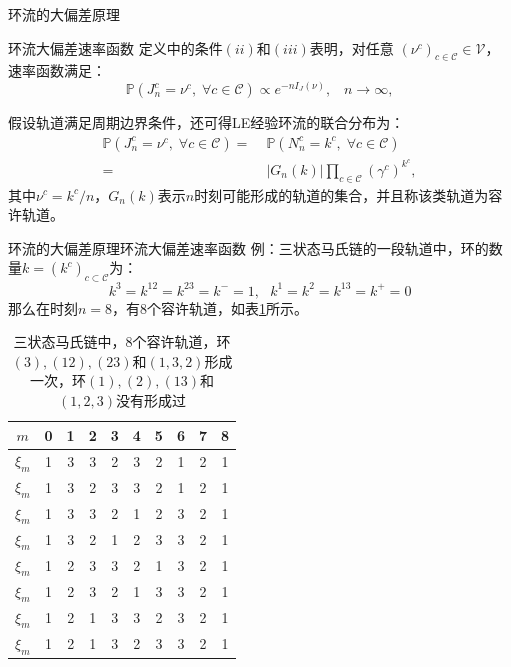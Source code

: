 \documentclass{beamer}
\begin{document}
\begin{frame}{环流的大偏差原理}
	\begin{block}{环流大偏差速率函数}
		定义中的条件$(ii)$和$(iii)$表明，对任意 $(\nu^c)_{c\in\mathcal{C}}\in\mathcal{V}$，速率函数满足：
		\begin{equation*}\label{LDP}
			\mathbb{P}(J^c_n=\nu^c,\;\forall c\in\mathcal{C})\propto e^{-n I_J(\nu)},\;\;\;n\to\infty,
		\end{equation*}

		假设轨道满足周期边界条件，还可得LE经验环流的联合分布为：
		\begin{equation*}\label{joint}
			\begin{split}
				\mathbb{P}\left(J^c_n=\nu^c,\;\forall c\in\mathcal{C}\right)
				=&\;\mathbb{P}\left(N^c_n=k^c,\;\forall c\in\mathcal{C}\right)\\
				=&\;|G_n(k)|\prod_{c\in\mathcal{C}}\left(\gamma^c\right)^{k^c},
			\end{split}
		\end{equation*}
		其中$\nu^c = k^c/n$，$G_n(k)$表示$n$时刻可能形成的轨道的集合，并且称该类轨道为容许轨道。
	\end{block}
\end{frame}

\begin{frame}{环流的大偏差原理}{环流大偏差速率函数}
	例：三状态马氏链的一段轨道中，环的数量$k=(k^c)_{c\subset \mathcal{C}}$为：
	\begin{equation*} \label{trajectory_ex}
		k^3 = k^{12} = k^{23} = k^- = 1, ~~~ k^1 = k^2 = k^{13} = k^+= 0
	\end{equation*}
	那么在时刻$n=8$，有8个容许轨道，如表\ref{table:all possible trajectories}所示。

	\begin{table}[htb!]
		\renewcommand\arraystretch{0.8}
		\begin{tabular}{cccccccccc}
			\hline
			$m$     & 0 & 1 & 2 & 3 & 4 & 5 & 6 & 7 & 8 \\\hline
			$\xi_m$ & 1 & 3 & 3 & 2 & 3 & 2 & 1 & 2 & 1 \\\hline
			$\xi_m$ & 1 & 3 & 2 & 3 & 3 & 2 & 1 & 2 & 1 \\\hline
			$\xi_m$ & 1 & 3 & 3 & 2 & 1 & 2 & 3 & 2 & 1 \\\hline
			$\xi_m$ & 1 & 3 & 2 & 1 & 2 & 3 & 3 & 2 & 1 \\\hline
			$\xi_m$ & 1 & 2 & 3 & 3 & 2 & 1 & 3 & 2 & 1 \\\hline
			$\xi_m$ & 1 & 2 & 3 & 2 & 1 & 3 & 3 & 2 & 1 \\\hline
			$\xi_m$ & 1 & 2 & 1 & 3 & 3 & 2 & 3 & 2 & 1 \\\hline
			$\xi_m$ & 1 & 2 & 1 & 3 & 2 & 3 & 3 & 2 & 1 \\\hline
		\end{tabular}\centering
		\caption{三状态马氏链中，8个容许轨道，环$(3), (12), (23)$和$(1,3,2)$形成一次，环$(1), (2), (13)$和$(1,2,3)$没有形成过}
		\label{table:all possible trajectories}
	\end{table}
\end{frame}
\end{document}
